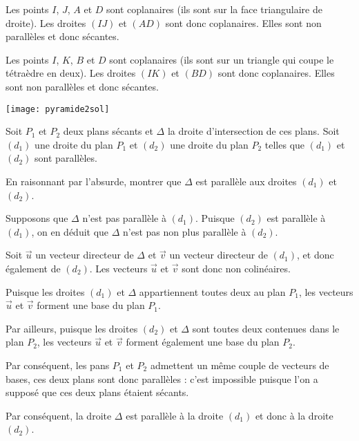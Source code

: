 \documentclass[11pt,fleqn, openany]{book} %
\begin{document}
\begin{solution}Les points $I$, $J$, $A$ et $D$ sont coplanaires (ils sont sur la face triangulaire de droite). Les droites $(IJ)$ et $(AD)$ sont donc coplanaires. Elles sont non parallèles et donc sécantes.

Les points $I$, $K$, $B$ et $D$ sont coplanaires (ils sont sur un triangle qui coupe le tétraèdre en deux). Les droites $(IK)$ et $(BD)$ sont donc coplanaires. Elles sont non parallèles et donc sécantes.

\begin{center}
\texttt{[image: pyramide2sol]}
\end{center}\end{solution}


\begin{exercise}[topic=geo02, subtitle={(Théorème du toit)}]
Soit $P_1$ et $P_2$ deux plans sécants et $\Delta$ la droite d'intersection de ces plans. Soit $(d_1)$ une droite du plan $P_1$ et $(d_2)$ une droite du plan $P_2$ telles que $(d_1)$ et $(d_2)$ sont parallèles.

En raisonnant par l'absurde, montrer que $\Delta$ est parallèle aux droites $(d_1)$ et $(d_2)$.

\end{exercise}

\begin{solution}
Supposons que $\Delta$ n'est pas parallèle à $(d_1)$. Puisque $(d_2)$ est parallèle à $(d_1)$, on en déduit que $\Delta$ n'est pas non plus parallèle à $(d_2)$.

Soit $\vec u$ un vecteur directeur de $\Delta$ et $\vec v$ un vecteur directeur de $(d_1)$, et donc également de $(d_2)$. Les vecteurs $\vec u$ et $\vec v$ sont donc non colinéaires.

Puisque les droites $(d_1)$ et $\Delta$ appartiennent toutes deux au plan $P_1$, les vecteurs $\vec u$ et $\vec v$ forment une base du plan $P_1$.

Par ailleurs, puisque les droites $(d_2)$ et $\Delta$ sont toutes deux contenues dans le plan $P_2$, les vecteurs $\vec u$ et $\vec v$ forment également une base du plan $P_2$. 

Par conséquent, les pans $P_1$ et $P_2$ admettent un même couple de vecteurs de bases, ces deux plans sont donc parallèles : c'est impossible puisque l'on a supposé que ces deux plans étaient sécants.

Par conséquent, la droite $\Delta$ est parallèle à la droite $(d_1)$ et donc à la droite $(d_2)$.
\end{solution}
\end{document}

